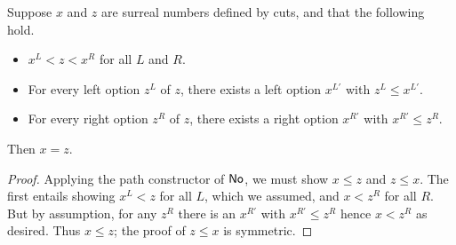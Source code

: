 \begin{thm}\label{thm:NO-simplicity}
  Suppose $x$ and $z$ are surreal numbers defined by cuts, and that the following hold.
  \begin{itemize}
  \item $x^L < z < x^R$ for all $L$ and $R$.
  \item For every left option $z^L$ of $z$, there exists a left option $x^{L'}$ with $z^L\le x^{L'}$.
  \item For every right option $z^R$ of $z$, there exists a right option $x^{R'}$ with $x^{R'}\le z^R$.
  \end{itemize}
  Then $x=z$.
\end{thm}
\begin{proof}
  Applying the path constructor of $\mathsf{No}$, we must show $x\le z$ and $z\le x$.
  The first entails showing $x^L<z$ for all $L$, which we assumed, and $x<z^R$ for all $R$.
  But by assumption, for any $z^R$ there is an $x^{R'}$ with $x^{R'}\le z^R$ hence $x<z^R$ as desired.
  Thus $x\le z$; the proof of $z\le x$ is symmetric.
\end{proof}


